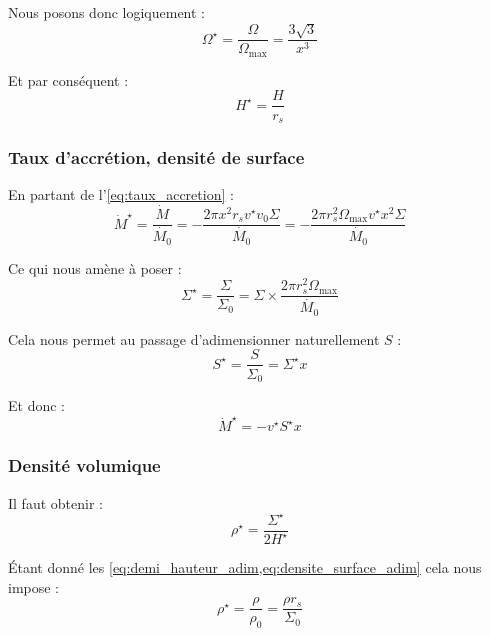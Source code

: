 Nous posons donc logiquement :
\begin{equation}
    \Omega^\star = \frac{\Omega}{\Omega_\mathrm{max}} = \frac{3\sqrt{3}}{x^3}
\end{equation}

Et par conséquent :
\begin{equation}
    \label{eq:demi_hauteur_adim}
    H^\star = \frac{H}{r_s}
\end{equation}

\subsubsection{Taux d’accrétion, densité de surface}

En partant de l’\cref{eq:taux_accretion} :
\begin{equation}
    \dot{M}^\star = \frac{\dot{M}}{\dot{M_0}} = - \frac{2 \pi x^2 r_s v^\star v_0 \Sigma}{\dot{M_0}} = - \frac{2 \pi r_s^2 \Omega_\mathrm{max} v^\star x^2 \Sigma}{\dot{M_0}} 
\end{equation}

Ce qui nous amène à poser :
\begin{equation}
    \label{eq:densite_surface_adim}
    \Sigma^\star = \frac{\Sigma}{\Sigma_0} = \Sigma \times \frac{2 \pi r_s^2 \Omega_\mathrm{max}}{\dot{M_0}}
\end{equation}

Cela nous permet au passage d’adimensionner naturellement $S$ :
\begin{equation}
    S^\star = \frac{S}{\Sigma_0} = \Sigma^\star x
\end{equation}

Et donc :
\begin{equation}
    \dot{M}^\star = - v^\star S^\star x
\end{equation}

\subsubsection{Densité volumique}

Il faut obtenir :
\begin{equation}
    \rho^\star = \frac{\Sigma^\star}{2 H^\star}
\end{equation}

Étant donné les \cref{eq:demi_hauteur_adim,eq:densite_surface_adim} cela nous
impose :
\begin{equation}
    \rho^\star = \frac{\rho}{\rho_0} = \frac{\rho r_s}{\Sigma_0}
\end{equation}

